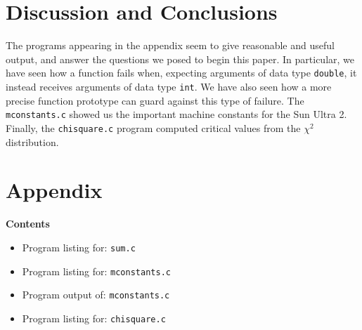 \documentclass{article}
\begin{document}
\section{Discussion and Conclusions}
The programs appearing in the appendix seem to give reasonable
and useful output, and answer the questions we posed to begin
this paper.  In particular, we have seen how a 
function fails when, expecting arguments of data type {\tt double},
it instead receives arguments of data type {\tt int}.  We have 
also seen how a more precise function prototype can guard against
this type of failure.  The {\tt mconstants.c} showed us the 
important machine constants for the Sun Ultra 2.  Finally, 
the {\tt chisquare.c} program computed critical values from
the $\chi^2$ distribution.
 
\section{Appendix}

{\bf Contents}
\begin{itemize}
\item Program listing for: {\tt sum.c}
\item Program listing for: {\tt mconstants.c}
\item Program output of: {\tt mconstants.c}
\item Program listing for: {\tt chisquare.c}
\end{itemize}
\end{document}
